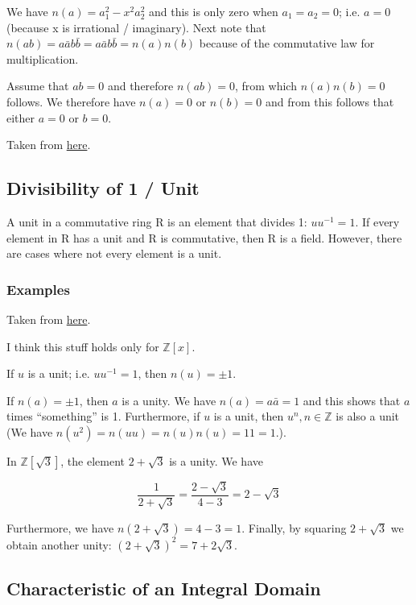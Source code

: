 We have \(n(a) = a_1^2 - x^2 a_2^2\) and this is only zero when
\(a_1=a_2=0\); i.e. \(a=0\) (because x is irrational / imaginary). Next
note that \(n(ab) = a \bar{a} b\bar{b} = a\bar{a}b\bar{b} = n(a)n(b)\)
because of the commutative law for multiplication.

Assume that \(ab=0\) and therefore \(n(ab)=0\), from which
\(n(a)n(b)=0\) follows. We therefore have \(n(a)=0\) or \(n(b)=0\) and
from this follows that either \(a=0\) or \(b=0\).

Taken from
\href{www.cut-the-knot.org/arithmetic/int_domain.shtml}{here}.

\subsection{Divisibility of 1 / Unit}\label{divisibility-of-1-unit}

A unit in a commutative ring R is an element that divides 1:
\(uu^{-1}=1\). If every element in R has a unit and R is commutative,
then R is a field. However, there are cases where not every element is a
unit.

\subsubsection{Examples}\label{examples-1}

Taken from
\href{http://www.cut-the-knot.org/arithmetic/int_domain2.shtml}{here}.

I think this stuff holds only for \(\mathbb{Z}[x]\).

If \(u\) is a unit; i.e. \(uu^{-1}=1\), then \(n(u)=\pm 1\).

If \(n(a)=\pm 1\), then \(a\) is a unity. We have \(n(a)=a\bar{a}=1\)
and this shows that \(a\) times ``something'' is 1. Furthermore, if
\(u\) is a unit, then \(u^n, n \in \mathbb{Z}\) is also a unit (We have
\(n(u^2) = n(uu) = n(u)n(u) = 1 1 = 1\).).

In \(\mathbb{Z}[\sqrt{3}]\), the element \(2+\sqrt{3}\) is a unity. We
have

\[
\frac{1}{2+\sqrt{3}} = \frac{2 - \sqrt{3}}{4-3} = 2 - \sqrt{3}
\]

Furthermore, we have \(n(2+\sqrt{3}) = 4 - 3 = 1\). Finally, by squaring
\(2 + \sqrt{3}\) we obtain another unity:
\((2 + \sqrt{3})^2 = 7 + 2\sqrt{3}\).

\subsection{Characteristic of an Integral
Domain}\label{characteristic-of-an-integral-domain}

